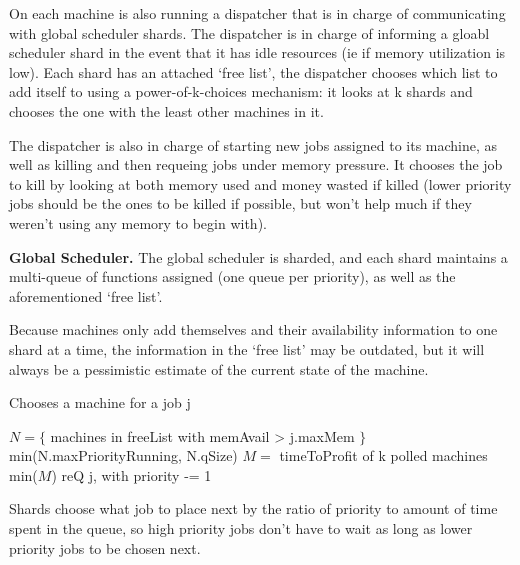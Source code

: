 On each machine is also running a dispatcher that is in charge of communicating
with global scheduler shards. The dispatcher is in charge of informing a gloabl
scheduler shard in the event that it has idle resources (ie if memory
utilization is low). Each shard has an attached `free list', the dispatcher
chooses which list to add itself to using a power-of-k-choices mechanism: it
looks at k shards and chooses the one with the least other machines in it. 

The dispatcher is also in charge of starting new jobs assigned to its machine,
as well as killing and then requeing jobs under memory pressure. It chooses the
job to kill by looking at both memory used and money wasted if killed (lower
priority jobs should be the ones to be killed if possible, but won't help much
if they weren't using any memory to begin with).



\textbf{Global Scheduler.}
The global scheduler is sharded, and each shard maintains a multi-queue of
functions assigned (one queue per priority), as well as the aforementioned `free
list'. 

Because machines only add themselves and their availability information to one
shard at a time, the information in the `free list' may be outdated, but it will
always be a pessimistic estimate of the current state of the machine.

\begin{algorithm}[t]
\caption{Chooses a machine for a job j}\label{alg:place}
\begin{algorithmic}
    \State$N = \{ $ machines in freeList with memAvail > j.maxMem $\}$
     \\
        \Return$ $min(N.maxPriorityRunning, N.qSize)
    \EndIf
    \State$M = $ timeToProfit of k polled machines
     \\
        \Return$ $min($M$)
    \Else
        \State$ $reQ j, with priority -= 1
    \EndIf
\end{algorithmic}
\end{algorithm}

Shards choose what job to place next by the ratio of priority to amount of
time spent in the queue, so high priority jobs don't have to wait as long
as lower priority jobs to be chosen next.

